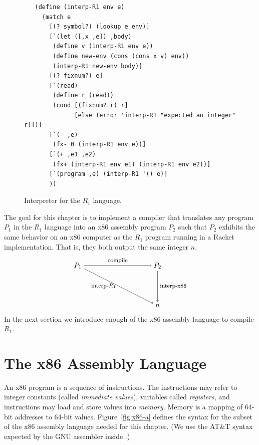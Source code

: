 \documentclass[11pt]{book}
\begin{document}
\begin{figure}[tbp]
\begin{lstlisting}
   (define (interp-R1 env e)
     (match e
       [(? symbol?) (lookup e env)]
       [`(let ([,x ,e]) ,body)
        (define v (interp-R1 env e))
        (define new-env (cons (cons x v) env))
        (interp-R1 new-env body)]
       [(? fixnum?) e]
       [`(read)
        (define r (read))
        (cond [(fixnum? r) r]
              [else (error 'interp-R1 "expected an integer" r)])]
       [`(- ,e)
        (fx- 0 (interp-R1 env e))]
       [`(+ ,e1 ,e2)
        (fx+ (interp-R1 env e1) (interp-R1 env e2))]
       [`(program ,e) (interp-R1 '() e)]
       ))
\end{lstlisting}
\caption{Interpreter for the $R_1$ language.}
\label{fig:interp-R1}
\end{figure}



The goal for this chapter is to implement a compiler that translates
any program $P_1$ in the $R_1$ language into an x86 assembly
program $P_2$ such that $P_2$ exhibits the same behavior on an x86
computer as the $R_1$ program running in a Racket implementation.
That is, they both output the same integer $n$.
\[
\begin{tikzpicture}[baseline=(current  bounding  box.center)]
 \node (p1) at (0,  0)   {$P_1$};
 \node (p2) at (4,  0)   {$P_2$};
 \node (o)  at (4, -2) {$n$};

 \path[->] (p1) edge [above] node {\footnotesize compile} (p2);
 \path[->] (p1) edge [left]  node {\footnotesize interp-$R_1$} (o);
 \path[->] (p2) edge [right] node {\footnotesize interp-x86} (o);
\end{tikzpicture}
\]
In the next section we introduce enough of the x86 assembly
language to compile $R_1$.

\section{The x86 Assembly Language}
\label{sec:x86}

An x86 program is a sequence of instructions. The instructions may
refer to integer constants (called \emph{immediate values}), variables
called \emph{registers}, and instructions may load and store values
into \emph{memory}.  Memory is a mapping of 64-bit addresses to 64-bit
values. Figure~\ref{fig:x86-a} defines the syntax for the subset of
the x86 assembly language needed for this chapter.  (We use the
AT\&T syntax expected by the GNU assembler inside .)
\end{document}
